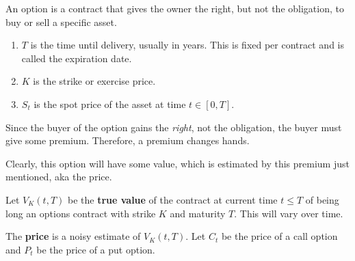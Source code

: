 \documentclass{article}
\begin{document}
    \begin{definition}[Options]
      An option is a contract that gives the owner the right, but not the obligation, to buy or sell a specific asset. 
      \begin{enumerate}
        \item $T$ is the time until delivery, usually in years. This is fixed per contract and is called the expiration date. 
        \item $K$ is the strike or exercise price. 
        \item $S_t$ is the spot price of the asset at time $t \in [0, T]$. 
      \end{enumerate}
      Since the buyer of the option gains the \textit{right}, not the obligation, the buyer must give some premium. Therefore, a premium changes hands. 
    \end{definition}

    Clearly, this option will have some value, which is estimated by this premium just mentioned, aka the price. 

    \begin{definition}[Value]
      Let $V_K (t, T)$ be the \textbf{true value} of the contract at current time $t \leq T$ of being long an options contract with strike $K$ and maturity $T$. This will vary over time. 

      The \textbf{price} is a noisy estimate of $V_K (t, T)$. Let $C_t$ be the price of a call option and $P_t$ be the price of a put option.
    \end{definition}
\end{document}
